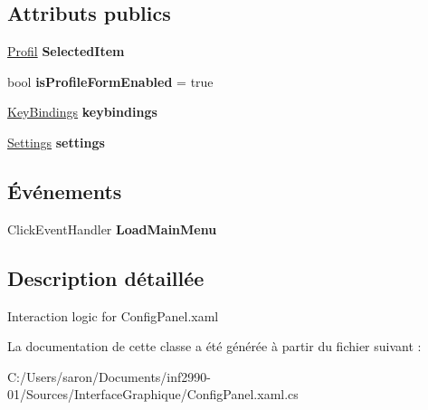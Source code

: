 \subsection*{Attributs publics}
\begin{DoxyCompactItemize}
\item 
\hypertarget{class_interface_graphique_1_1_config_panel_a65e81ecd1c7584257fda71c8c382ebdb}{\hyperlink{class_interface_graphique_1_1_profil}{Profil} {\bfseries Selected\-Item}}\label{class_interface_graphique_1_1_config_panel_a65e81ecd1c7584257fda71c8c382ebdb}

\item 
\hypertarget{class_interface_graphique_1_1_config_panel_a1965af1378c44678db40ee365c5bebd0}{bool {\bfseries is\-Profile\-Form\-Enabled} = true}\label{class_interface_graphique_1_1_config_panel_a1965af1378c44678db40ee365c5bebd0}

\item 
\hypertarget{class_interface_graphique_1_1_config_panel_a672032385e973ce332d986e3d3ed42d7}{\hyperlink{class_interface_graphique_1_1_key_bindings}{Key\-Bindings} {\bfseries keybindings}}\label{class_interface_graphique_1_1_config_panel_a672032385e973ce332d986e3d3ed42d7}

\item 
\hypertarget{class_interface_graphique_1_1_config_panel_a611b859778d97914289ba09523a208e6}{\hyperlink{class_interface_graphique_1_1_settings}{Settings} {\bfseries settings}}\label{class_interface_graphique_1_1_config_panel_a611b859778d97914289ba09523a208e6}

\end{DoxyCompactItemize}
\subsection*{Événements}
\begin{DoxyCompactItemize}
\item 
\hypertarget{class_interface_graphique_1_1_config_panel_a17fac5244e6f1acf42259e796b55de6b}{Click\-Event\-Handler {\bfseries Load\-Main\-Menu}}\label{class_interface_graphique_1_1_config_panel_a17fac5244e6f1acf42259e796b55de6b}

\end{DoxyCompactItemize}


\subsection{Description détaillée}
Interaction logic for Config\-Panel.\-xaml 



La documentation de cette classe a été générée à partir du fichier suivant \-:\begin{DoxyCompactItemize}
\item 
C\-:/\-Users/saron/\-Documents/inf2990-\/01/\-Sources/\-Interface\-Graphique/Config\-Panel.\-xaml.\-cs\end{DoxyCompactItemize}
